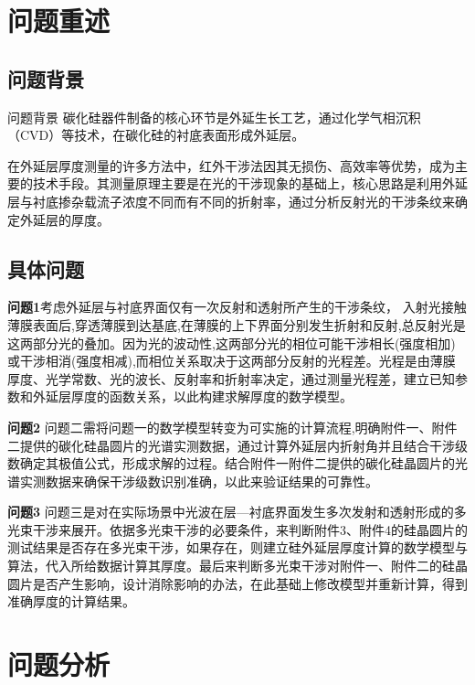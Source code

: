 \documentclass[withoutpreface,bwprint]{cumcmthesis}
\begin{document}

\section{问题重述}
\subsection{问题背景}
问题背景
碳化硅器件制备的核心环节是外延生长工艺，通过化学气相沉积（CVD）等技术，在碳化硅的衬底表面形成外延层。

在外延层厚度测量的许多方法中，红外干涉法因其无损伤、高效率等优势，成为主要的技术手段。其测量原理主要是在光的干涉现象的基础上，核心思路是利用外延层与衬底掺杂载流子浓度不同而有不同的折射率，通过分析反射光的干涉条纹来确定外延层的厚度。

\subsection{具体问题}
\textbf{问题1}考虑外延层与衬底界面仅有一次反射和透射所产生的干涉条纹，
入射光接触薄膜表面后,穿透薄膜到达基底,在薄膜的上下界面分别发生折射和反射,总反射光是这两部分光的叠加。因为光的波动性,这两部分光的相位可能干涉相长(强度相加)或干涉相消(强度相减),而相位关系取决于这两部分反射的光程差。光程是由薄膜厚度、光学常数、光的波长、反射率和折射率决定，通过测量光程差，建立已知参数和外延层厚度的函数关系，以此构建求解厚度的数学模型。

\textbf{问题2}  问题二需将问题一的数学模型转变为可实施的计算流程,明确附件一、附件二提供的碳化硅晶圆片的光谱实测数据，通过计算外延层内折射角并且结合干涉级数确定其极值公式，形成求解的过程。结合附件一附件二提供的碳化硅晶圆片的光谱实测数据来确保干涉级数识别准确，以此来验证结果的可靠性。

\textbf{问题3} 问题三是对在实际场景中光波在层—衬底界面发生多次发射和透射形成的多光束干涉来展开。依据多光束干涉的必要条件，来判断附件3、附件4的硅晶圆片的测试结果是否存在多光束干涉，如果存在，则建立硅外延层厚度计算的数学模型与算法，代入所给数据计算其厚度。最后来判断多光束干涉对附件一、附件二的硅晶圆片是否产生影响，设计消除影响的办法，在此基础上修改模型并重新计算，得到准确厚度的计算结果。


\section{问题分析}
\end{document}
